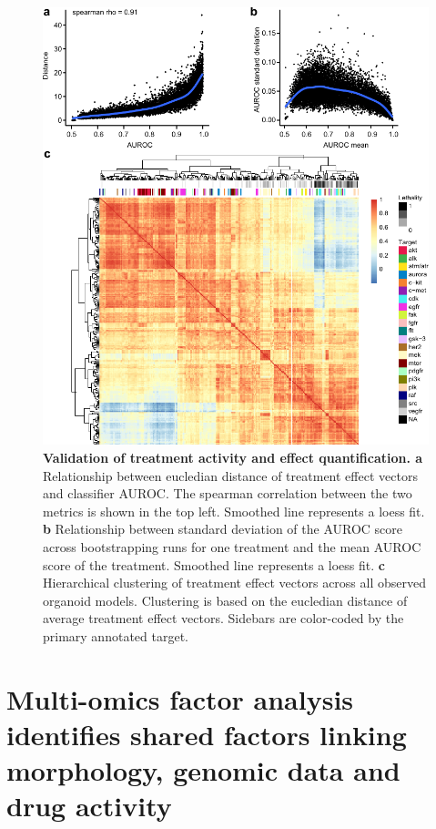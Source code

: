 \begin{flushleft}
\begin{figure}[h!]
\centering
\includegraphics[width=\textwidth,
                height=\textheight,
                keepaspectratio]{figures/promise/pdf/fig_3_2.pdf}
\caption[Validation of treatment activity and effect quantification]{\textbf{Validation of treatment activity and effect quantification. a} Relationship between eucledian distance of treatment effect vectors and classifier AUROC. The spearman correlation between the two metrics is shown in the top left. Smoothed line represents a loess fit. \textbf{b} Relationship between standard deviation of the AUROC score across bootstrapping runs for one treatment and the mean AUROC score of the treatment. Smoothed line represents a loess fit. \textbf{c} Hierarchical clustering of treatment effect vectors across all observed organoid models. Clustering is based on the eucledian distance of average treatment effect vectors. Sidebars are color-coded by the primary annotated target.}
\label{fig_232}
\end{figure}
\bigbreak


\newpage

\section{Multi-omics factor analysis identifies shared factors linking morphology, genomic data and drug activity}


\end{flushleft}
